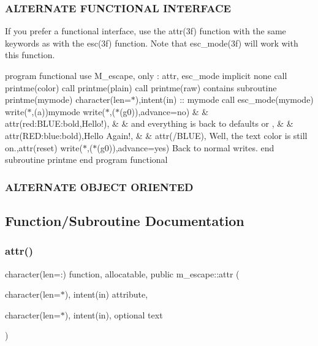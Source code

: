 \subsubsection*{A\+L\+T\+E\+R\+N\+A\+TE F\+U\+N\+C\+T\+I\+O\+N\+AL I\+N\+T\+E\+R\+F\+A\+CE}

If you prefer a functional interface, use the attr(3f) function with the same keywords as with the esc(3f) function. Note that esc\+\_\+mode(3f) will work with this function.

program functional use M\+\_\+escape, only \+: attr, esc\+\_\+mode implicit none call printme(\textquotesingle{}color\textquotesingle{}) call printme(\textquotesingle{}plain\textquotesingle{}) call printme(\textquotesingle{}raw\textquotesingle{}) contains subroutine printme(mymode) character(len=$\ast$),intent(in) \+:\+: mymode call esc\+\_\+mode(mymode) write($\ast$,\textquotesingle{}(a)\textquotesingle{})mymode write($\ast$,\textquotesingle{}($\ast$(g0))\textquotesingle{},advance=\textquotesingle{}no\textquotesingle{}) \& \& attr(\textquotesingle{}red\+:\+B\+L\+UE\+:bold\textquotesingle{},\textquotesingle{}Hello!\textquotesingle{}), \& \& \textquotesingle{}and everything is back to defaults or \textquotesingle{}, \& \& attr(\textquotesingle{}R\+E\+D\+:blue\+:bold\textquotesingle{}),\textquotesingle{}Hello Again!\textquotesingle{}, \& \& attr(\textquotesingle{}/\+B\+L\+UE\textquotesingle{}),\textquotesingle{} Well, the text color is still on.\textquotesingle{},attr(\textquotesingle{}reset\textquotesingle{}) write($\ast$,\textquotesingle{}($\ast$(g0))\textquotesingle{},advance=\textquotesingle{}yes\textquotesingle{})\textquotesingle{} Back to normal writes.\textquotesingle{} end subroutine printme end program functional

\subsubsection*{A\+L\+T\+E\+R\+N\+A\+TE O\+B\+J\+E\+CT O\+R\+I\+E\+N\+T\+ED}

\subsection{Function/\+Subroutine Documentation}
\mbox{\label{namespacem__escape_a916b16ce9be553d669f54cb9575a91be}} 
\subsubsection{\texorpdfstring{attr()}{attr()}}
{\footnotesize\ttfamily character(len=\+:) function, allocatable, public m\+\_\+escape\+::attr (\begin{DoxyParamCaption}\item[{character(len=$\ast$), intent(in)}]{attribute,  }\item[{character(len=$\ast$), intent(in), optional}]{text }\end{DoxyParamCaption})}



